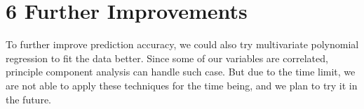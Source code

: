 \documentclass[9pt,twocolumn,twoside]{pnas-new}
\begin{document}
\section*{6 Further Improvements}
\noindent To further improve prediction accuracy, we could also try multivariate polynomial regression to fit the data better. Since some of our variables are correlated, principle component analysis can handle such case. But due to the time limit, we are not able to apply these techniques for the time being, and we plan to try it in the future.


\showmatmethods{} %



\showacknow{} %



\end{document}
